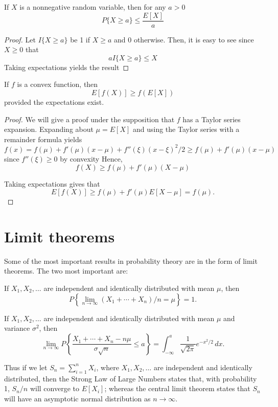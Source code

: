 \documentclass[lang=cn,10pt]{elegantbook}
\begin{document}
\begin{lemma}
	If $X$ is a nonnegative random variable, then for any $a > 0$
\[
P\{X \geq a\} \leq \frac{E[X]}{a}
\]
\end{lemma}

\begin{proof}
	Let $I\{X \geq a\}$ be 1 if $X \geq a$ and 0 otherwise. Then, it is easy to see since $X \geq 0$ that
	\[
	a I\{X \geq a\} \leq X
	\]
	Taking expectations yields the result
\end{proof}
\begin{lemma}
	If $f$ is a convex function, then
\[
E[f(X)] \geq f(E[X])
\]
provided the expectations exist.
\end{lemma}
\begin{proof}
	We will give a proof under the supposition that $f$ has a Taylor series expansion. Expanding about $\mu = E[X]$ and using the Taylor series with a remainder formula yields
\[
f(x) = f(\mu) + f'(\mu)(x - \mu) + f''(\xi)(x - \xi)^2/2 \geq f(\mu) + f'(\mu)(x - \mu)
\]
since $f''(\xi) \geq 0$ by convexity Hence,
\[
f(X) \geq f(\mu) + f'(\mu)(X - \mu)
\]

Taking expectations gives that
\[
E[f(X)] \geq f(\mu) + f'(\mu)E[X - \mu] = f(\mu).
\]
\end{proof}
\section{Limit theorems}
Some of the most important results in probability theory are in the form of limit theorems. The two most important are:
\begin{theorem}
	If $X_1, X_2, \ldots$ are independent and identically distributed with mean $\mu$, then
\[
P\left\{\lim_{n \to \infty} (X_1 + \cdots + X_n)/n = \mu\right\} = 1.
\]
\end{theorem}
\begin{theorem}
	If $X_1, X_2, \ldots$ are independent and identically distributed with mean $\mu$ and variance $\sigma^2$, then
\[
\lim_{n \to \infty} P\left\{\frac{X_1 + \cdots + X_n - n\mu}{\sigma \sqrt{n}} \leq a\right\} = \int_{-\infty}^{a} \frac{1}{\sqrt{2\pi}} e^{-x^2/2} \, dx.
\]
\end{theorem}
Thus if we let $S_n = \sum_{i=1}^{n} X_i$, where $X_1, X_2, \ldots$ are independent and identically distributed, then the Strong Law of Large Numbers states that, with probability 1, $S_n/n$ will converge to $E[X_i]$; whereas the central limit theorem states that $S_n$ will have an asymptotic normal distribution as $n \to \infty$.
\end{document}
